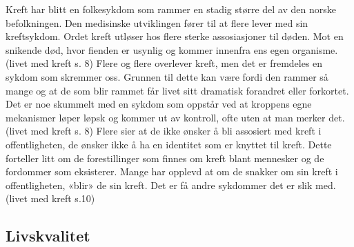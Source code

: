 Kreft har blitt en folkesykdom som rammer en stadig større del av den norske
befolkningen. Den medisinske utviklingen fører til at flere lever med sin
kreftsykdom. Ordet kreft utløser hos flere sterke assosiasjoner til døden. Mot
en snikende død, hvor fienden er usynlig og kommer innenfra ens egen organisme.
(livet med kreft s. 8) Flere og flere overlever kreft, men det er fremdeles en
sykdom som skremmer oss. Grunnen til dette kan være fordi den rammer så mange
og at de som blir rammet får livet sitt dramatisk forandret eller forkortet.
Det er noe skummelt med en sykdom som oppstår ved at kroppens egne mekanismer
løper løpsk og kommer ut av kontroll, ofte uten at man merker det. (livet med
    kreft s. 8) Flere sier at de ikke ønsker å bli assosiert med kreft i
offentligheten, de ønsker ikke å ha en identitet som er knyttet til kreft.
Dette forteller litt om de forestillinger som finnes om kreft blant mennesker
og de fordommer som eksisterer. Mange har opplevd at om de snakker om sin kreft
i offentligheten, «blir» de sin kreft. Det er få andre sykdommer det er slik
med. (livet med kreft s.10)

\subsection{Livskvalitet}

